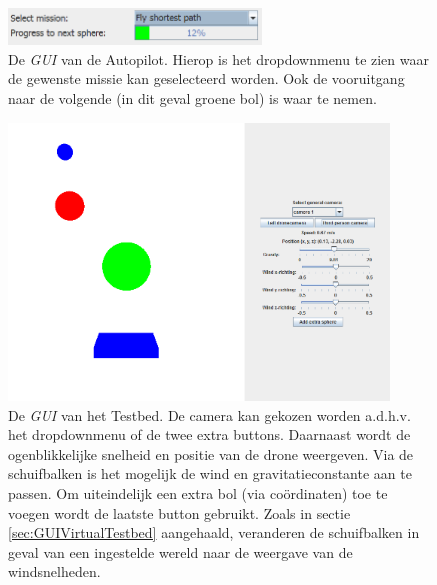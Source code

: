 \begin{figure}[h]
	\centering
	\includegraphics[width=0.6\textwidth]{AutopilotGUI.png}
	\caption{De \textit{GUI} van de Autopilot. Hierop is het dropdownmenu te zien waar de gewenste missie kan geselecteerd worden. Ook de vooruitgang naar de volgende (in dit geval groene bol) is waar te nemen.}
\end{figure}
\begin{figure}[h]
	\centering
	\includegraphics[width=0.9\textwidth]{TestbedGUI.png}
	\caption{De \textit{GUI} van het Testbed. De camera kan gekozen worden a.d.h.v. het dropdownmenu of de twee extra buttons. Daarnaast wordt de ogenblikkelijke snelheid en positie van de drone weergeven. Via de schuifbalken is het mogelijk de wind en gravitatieconstante aan te passen. Om uiteindelijk een extra bol (via co\"ordinaten) toe te voegen wordt de laatste button gebruikt. Zoals in sectie \ref{sec:GUIVirtualTestbed} aangehaald, veranderen de schuifbalken in geval van een ingestelde wereld naar de weergave van de windsnelheden.}
\end{figure}